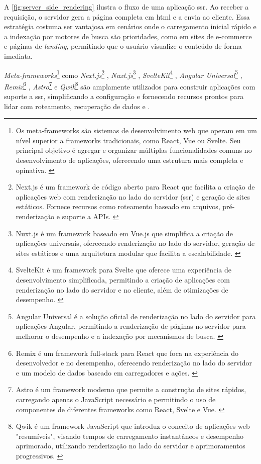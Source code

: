 A \autoref{fig:server_side_rendering} ilustra o fluxo de uma aplicação \acrshort{ssr}. Ao receber a requisição, o servidor gera a página completa em \acrshort{html} e a envia ao cliente. Essa estratégia costuma ser vantajosa em cenários onde o carregamento inicial rápido e a indexação por motores de busca são prioridades, como em sites de e-commerce e páginas de \emph{landing}, permitindo que o usuário visualize o conteúdo de forma imediata. 


\emph{Meta-\-frameworks}\footnote{
  Os meta-frameworks são sistemas de desenvolvimento web que operam em um nível superior a frameworks tradicionais, como React, Vue ou Svelte. Seu principal objetivo é agregar e organizar múltiplas funcionalidades comuns no desenvolvimento de aplicações, oferecendo uma estrutura mais completa e opinativa. \cite{benHolmes}
} como \emph{Next.js}\footnote{Next.js é um framework de código aberto para React que facilita a criação de aplicações web com renderização no lado do servidor (\acrshort{ssr}) e geração de sites estáticos. Fornece recursos como roteamento baseado em arquivos, pré-renderização e suporte a APIs. \cite{nextjs2024}} , \emph{Nuxt.js}\footnote{Nuxt.js é um framework baseado em Vue.js que simplifica a criação de aplicações universais, oferecendo renderização no lado do servidor, geração de sites estáticos e uma arquitetura modular que facilita a escalabilidade. \cite{nuxtjs2024}} , \emph{SvelteKit}\footnote{SvelteKit é um framework para Svelte que oferece uma experiência de desenvolvimento simplificada, permitindo a criação de aplicações com renderização no lado do servidor e no cliente, além de otimizações de desempenho. \cite{sveltekit2024}} , \emph{Angular Universal}\footnote{Angular Universal é a solução oficial de renderização no lado do servidor para aplicações Angular, permitindo a renderização de páginas no servidor para melhorar o desempenho e a indexação por mecanismos de busca. \cite{angularuniversal2024}} , \emph{Remix}\footnote{Remix é um framework full-stack para React que foca na experiência do desenvolvedor e no desempenho, oferecendo renderização no lado do servidor e um modelo de dados baseado em carregadores e ações. \cite{remix2024}} , \emph{Astro}\footnote{Astro é um framework moderno que permite a construção de sites rápidos, carregando apenas o JavaScript necessário e permitindo o uso de componentes de diferentes frameworks como React, Svelte e Vue. \cite{astro2024}} e \emph{Qwik}\footnote{Qwik é um framework JavaScript que introduz o conceito de aplicações web "resumíveis", visando tempos de carregamento instantâneos e desempenho aprimorado, utilizando renderização no lado do servidor e aprimoramentos progressivos. \cite{qwik2024}} são amplamente utilizados para construir aplicações com suporte a \acrshort{ssr}, simplificando a configuração e fornecendo recursos prontos para lidar com roteamento, recuperação de dados e .

